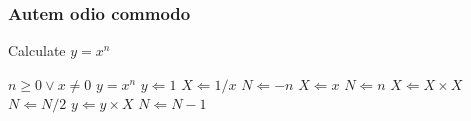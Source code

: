 \subsubsection{Autem odio commodo}
\begin{algorithm}[H]
  \caption{Calculate $y = x^n$}
  \label{alg2}
  \begin{algorithmic}[1]
    \REQUIRE $n \geq 0 \vee x \neq 0$
    \ENSURE $y = x^n$
    \STATE $y \Leftarrow 1$
    \STATE $X \Leftarrow 1 / x$
    \STATE $N \Leftarrow -n$
    \ELSE
    \STATE $X \Leftarrow x$
    \STATE $N \Leftarrow n$
    \ENDIF
    \label{alg:n-is-even}
    \STATE $X \Leftarrow X \times X$
    \STATE $N \Leftarrow N / 2$
    \ELSE\label{alg:n-is-odd}
    \STATE $y \Leftarrow y \times X$
    \STATE $N \Leftarrow N - 1$
    \ENDIF
    \ENDWHILE
  \end{algorithmic}
\end{algorithm}

